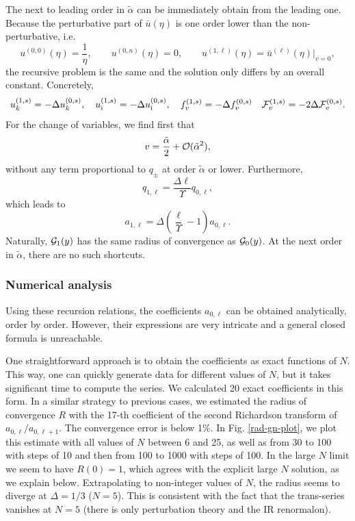 \documentclass[a4paper,11pt]{article}
\theoremstyle{definition}
\newcommand{\CF}{{\cal F}}
\newcommand{\CG}{{\cal G}}
\newcommand{\CO}{{\cal O}}
\newcommand{\ri}{{\rm i}}
\newcommand{\be}{\begin{equation}}
\newcommand{\ee}{\end{equation}}
\begin{document}

The next to leading order in $\tilde{\alpha}$ can be immediately obtain from the leading one. Because the perturbative part of $\bar{u}(\eta)$ is one order lower than the non-perturbative, i.e.
\be
u^{(0,0)}(\eta)= \frac{1}{\eta} , \qquad u^{(0,n)}(\eta)= 0, \qquad u^{(1,\ell)}(\eta)= \bar{u}^{(\ell)}(\eta)\big|_{v=0},
\ee
the recursive problem is the same and the solution only differs by an overall constant.
Concretely,
\begin{equation}
u_k^{(1,s)} = -\Delta u_k^{(0,s)},\quad
u_\ri^{(1,s)}=-\Delta u_\ri^{(0,s)},\quad f_v^{(1,s)}=-\Delta f_v^{(0,s)} \quad \CF_v^{(1,s)}=-2\Delta \CF_v^{(0,s)}.
\label{lo-to-nlo}
\end{equation}
For the change of variables, we find first that 
\begin{equation}
v = \frac{\tilde{\alpha}}{2}+\CO(\tilde{\alpha}^2),
\end{equation}
without any term proportional to $q_\pm$ at order $\tilde{\alpha}$ or lower. Furthermore,
%
\begin{equation}
q_{1, \ell} = \frac{\Delta \ell}{\Upsilon} q_{0, \ell}, 
\end{equation}
%
which leads to
%
\begin{equation}
a_{1, \ell} = \Delta\left(\frac{\ell}{\Upsilon}-1\right)a_{0, \ell}.
\label{F1-f0}
\end{equation}
Naturally, $\CG_1(y)$ has the same radius of convergence as $\CG_0(y)$.
At the next order in $\tilde\alpha$, there are no such shortcuts.%

\subsubsection{Numerical analysis}

Using these recursion relations, the coefficients $a_{0,\ell}$ can be obtained analytically, order by order. However, their expressions are very intricate and a general closed formula is unreachable. 

One straightforward approach is to obtain the coefficients as exact functions of $N$. This way, one can quickly generate data for different values of $N$, but it takes significant time to compute the series. We calculated 20 exact coefficients in this form. In a similar strategy to previous cases, we estimated the radius of convergence $R$ with the 17-th coefficient of the second Richardson transform of $a_{0,\ell}/a_{0,\ell+1}$. The convergence error is below 1\%.
In Fig. \ref{rad-gn-plot}, we plot this estimate with all values of $N$ between 6 and 25, as well as from 30 to 100 with steps of 10 and then from 100 to 1000 with steps of 100.  In the large $N$ limit we seem to have $R(0)=1$, which agrees with the explicit large $N$ solution, as we explain below. Extrapolating to non-integer values of $N$, the radius seems to diverge at $\Delta=1/3$ ($N=5$). This is consistent with the fact that the trans-series vanishes at $N=5$ (there is only perturbation theory and the IR renormalon).
\end{document}
